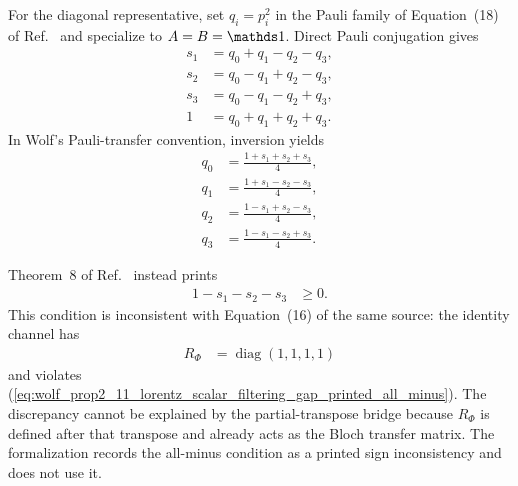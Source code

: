 \documentclass{article}
\begin{document}
For the diagonal representative, set $q_i=p_i^2$ in the Pauli family of
Equation~(18) of Ref.~\cite{VerstraeteVerschelde2002QuantumChannels} and
specialize to $A=B=\one$. Direct Pauli conjugation gives
\begin{align}
    s_1
        &=q_0+q_1-q_2-q_3,
    \label{eq:wolf_prop2_11_lorentz_scalar_filtering_gap_diagonal_s1}\\
    s_2
        &=q_0-q_1+q_2-q_3,
    \label{eq:wolf_prop2_11_lorentz_scalar_filtering_gap_diagonal_s2}\\
    s_3
        &=q_0-q_1-q_2+q_3,
    \label{eq:wolf_prop2_11_lorentz_scalar_filtering_gap_diagonal_s3}\\
    1
        &=q_0+q_1+q_2+q_3.
    \label{eq:wolf_prop2_11_lorentz_scalar_filtering_gap_weight_sum}
\end{align}
In Wolf's Pauli-transfer convention, inversion yields
\begin{align}
    q_0
        &=\frac{1+s_1+s_2+s_3}{4},
    \label{eq:wolf_prop2_11_lorentz_scalar_filtering_gap_weight_q0}\\
    q_1
        &=\frac{1+s_1-s_2-s_3}{4},
    \label{eq:wolf_prop2_11_lorentz_scalar_filtering_gap_weight_q1}\\
    q_2
        &=\frac{1-s_1+s_2-s_3}{4},
    \label{eq:wolf_prop2_11_lorentz_scalar_filtering_gap_weight_q2}\\
    q_3
        &=\frac{1-s_1-s_2+s_3}{4}.
    \label{eq:wolf_prop2_11_lorentz_scalar_filtering_gap_weight_q3}
\end{align}

Theorem~8 of Ref.~\cite{VerstraeteVerschelde2002QuantumChannels} instead
prints
\begin{align}
    1-s_1-s_2-s_3
        &\geq0.
    \label{eq:wolf_prop2_11_lorentz_scalar_filtering_gap_printed_all_minus}
\end{align}
This condition is inconsistent with Equation~(16) of the same source: the
identity channel has
\begin{align}
    R_\Phi
        &=\operatorname{diag}(1,1,1,1)
    \label{eq:wolf_prop2_11_lorentz_scalar_filtering_gap_identity_transfer}
\end{align}
and violates
(\ref{eq:wolf_prop2_11_lorentz_scalar_filtering_gap_printed_all_minus}).
The discrepancy cannot be explained by the partial-transpose bridge because
$R_\Phi$ is defined after that transpose and already acts as the Bloch
transfer matrix. The formalization records the all-minus condition as a
printed sign inconsistency and does not use it.
\end{document}
